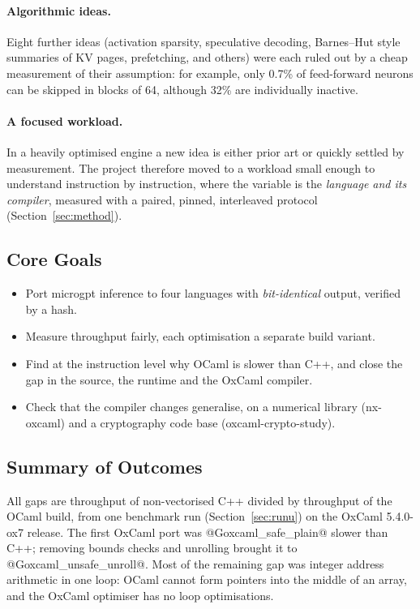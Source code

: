 \paragraph{Algorithmic ideas.} Eight further ideas (activation sparsity,
speculative decoding, Barnes--Hut style summaries of KV pages, prefetching, and
others) were each ruled out by a cheap measurement of their assumption: for
example, only 0.7\% of feed-forward neurons can be skipped in blocks of 64,
although 32\% are individually inactive.

\paragraph{A focused workload.} In a heavily optimised engine a new idea is
either prior art or quickly settled by measurement. The project therefore
moved to a workload small enough to understand instruction by instruction,
where the variable is the \emph{language and its compiler}, measured with a
paired, pinned, interleaved protocol (Section~\ref{sec:method}).

\subsection{Core Goals}
\begin{itemize}
  \item Port microgpt inference to four languages with \emph{bit-identical}
        output, verified by a hash.
  \item Measure throughput fairly, each optimisation a separate build variant.
  \item Find at the instruction level why OCaml is slower than C++, and close
        the gap in the source, the runtime and the OxCaml compiler.
  \item Check that the compiler changes generalise, on a numerical library
        (nx-oxcaml) and a cryptography code base (oxcaml-crypto-study).
\end{itemize}

\subsection{Summary of Outcomes}
All gaps are throughput of non-vectorised C++ divided by throughput of the
OCaml build, from one benchmark run (Section~\ref{sec:runu}) on the OxCaml
5.4.0-ox7 release. The first OxCaml port was @G{oxcaml_safe_plain}@ slower
than C++; removing bounds checks and unrolling brought it to
@G{oxcaml_unsafe_unroll}@. Most of the remaining gap was integer address
arithmetic in one loop: OCaml cannot form pointers into the middle of an
array, and the OxCaml optimiser has no loop optimisations.

